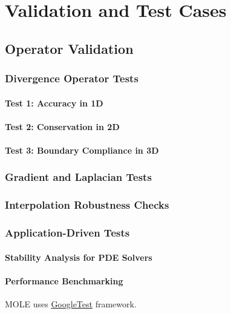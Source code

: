 \part{Validation and Test Cases}

\chapter{Operator Validation}

\section{Divergence Operator Tests}

\subsection{Test 1: Accuracy in 1D}
\subsection{Test 2: Conservation in 2D}
\subsection{Test 3: Boundary Compliance in 3D}
\section{Gradient and Laplacian Tests}
\section{Interpolation Robustness Checks}
\section{Application-Driven Tests}
\subsection{Stability Analysis for PDE Solvers}
\subsection{Performance Benchmarking}

MOLE uses \href{https://google.github.io/googletest}{GoogleTest} framework.

